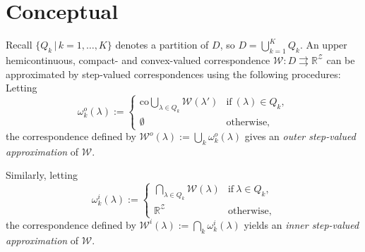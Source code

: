 \documentclass[a4paper,10pt,english]{sphinxmanual}
\begin{document}
\section{Conceptual}
\label{payoff_concept:conceptual}
Recall \(\{Q_k\,|\,k=1,\ldots ,K\}\) denotes a partition of \(D\), so
\(D=\bigcup_{k=1}^K Q_k\). An upper hemicontinuous, compact- and
convex-valued correspondence \(\mathcal{W}:D \rightrightarrows
\mathbb{R}^\mathcal{Z}\) can be approximated by step-valued correspondences using the following procedures: Letting
   \begin{equation*}
        \omega^o_k (\lambda) :=
        \begin{cases}
        \text{co}\bigcup_{\lambda \in Q_k}\mathcal{W}(\lambda') & \text{if} \ (\lambda) \in Q_k,\\
        \emptyset & \text{otherwise},
        \end{cases}
    \end{equation*}
the correspondence defined by \(\mathcal{W}^o(\lambda) :=
\bigcup_{k}\omega^o_k (\lambda)\) gives an \emph{outer step-valued approximation}
of \(\mathcal{W}\).

Similarly, letting
    \begin{equation*}
        \omega^i_k (\lambda) :=
        \begin{cases}
         \bigcap_{\lambda \in Q_k}\mathcal{W}(\lambda) & \text{if} \ \lambda \in Q_k,
         \\
        \mathbb{R}^\mathcal{Z} & \text{otherwise},
        \end{cases}
    \end{equation*}
the correspondence defined by \(\mathcal{W}^i(\lambda) :=
\bigcap_{k}\omega^i_k (\lambda)\) yields an \emph{inner step-valued approximation}
of \(\mathcal{W}\).
\end{document}
